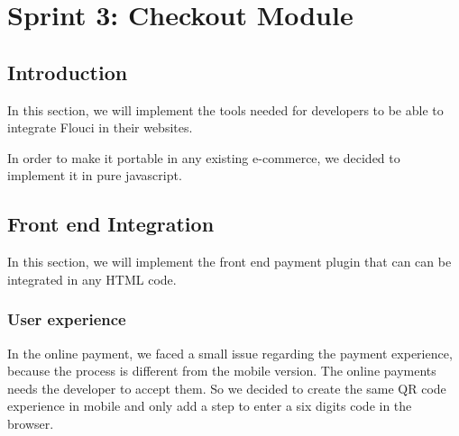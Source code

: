 
\setcounter{chapter}{4}
\chapter{Sprint 3: Checkout Module}
\minitoc %
\graphicspath{{Chapter5/figures/}}

\pagestyle{fancy}
\fancyhf{}
\fancyhead[R]{\bfseries\rightmark}
\fancyfoot[R]{\thepage}
\renewcommand{\headrulewidth}{0.5pt}
\renewcommand{\footrulewidth}{0pt}
\renewcommand{\chaptermark}[1]{\markboth{\MakeUppercase{\chaptername~\thechapter. #1 }}{}}
\renewcommand{\sectionmark}[1]{\markright{\thechapter.\thesection~ #1}}


\begin{spacing}{1.2}

\section*{Introduction}
In this section, we will implement the tools needed for developers to be able to integrate Flouci in their websites. 

In order to make it portable in any existing e-commerce, we decided to implement it in pure javascript.
\section{Front end Integration}
In this section, we will implement the front end payment plugin that can can be integrated in any HTML code.
\subsection{User experience}
In the online payment, we faced a small issue regarding the payment experience, because the process is different from the mobile version. The online payments needs the developer to accept them.
So we decided to create the same QR code experience in mobile and only add a step to enter a six digits code in the browser.


\end{spacing}
